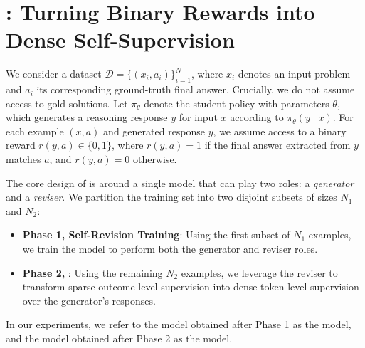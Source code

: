 


\section{\ours{}: Turning Binary Rewards into Dense Self-Supervision} \label{sec:method}


We consider a dataset $\mathcal{D} = \{(x_i, a_i)\}_{i=1}^N$, where $x_i$ denotes an input problem and $a_i$ its corresponding ground-truth final answer. Crucially, we do not assume access to gold solutions. Let $\pi_\theta$ denote the student policy with parameters $\theta$, which generates a reasoning response $y$ for input $x$ according to $\pi_\theta(y \mid x)$. For each example $(x, a)$ and generated response $y$, we assume access to a binary reward $r(y,a) \in \{0,1\}$, where $r(y,a)=1$ if the final answer extracted from $y$ matches $a$, and $r(y,a)=0$ otherwise.

The core design of \ours{} is around a single model that can play two roles: a \emph{generator} and a \emph{reviser}. We partition the training set into two disjoint subsets of sizes $N_1$ and $N_2$:
\begin{itemize}
\setlength{\itemsep}{-0.2em}
\item  \textbf{Phase 1, Self-Revision Training}: Using the first subset of $N_1$ examples, we train the model to perform both the generator and reviser roles.\newline
\item   \textbf{Phase 2, \opsd{}}: Using the remaining $N_2$ examples, we leverage the reviser to transform sparse outcome-level supervision into dense token-level supervision over the generator's responses.
\end{itemize}

In our experiments, we refer to the model obtained after Phase 1 as the \sft{} model, and the model obtained after Phase 2 as the \ours{} model.



